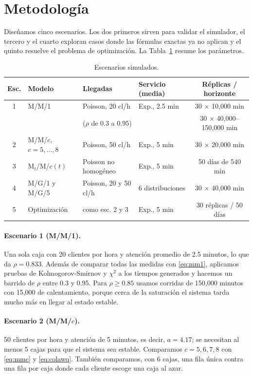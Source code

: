 \documentclass[11pt,letterpaper]{article}
\begin{document}
\section{Metodología}
Diseñamos cinco escenarios. Los dos primeros sirven para validar el simulador, el tercero
y el cuarto exploran casos donde las fórmulas exactas ya no aplican y el quinto resuelve
el problema de optimización. La Tabla~\ref{tab:escenarios} resume los parámetros.

\begin{table}[H]
\centering
\caption{Escenarios simulados.}
\label{tab:escenarios}
\small
\begin{tabular}{@{}clllc@{}}
\toprule
Esc. & Modelo & Llegadas & Servicio (media) & Réplicas / horizonte \\
\midrule
1 & M/M/1 & Poisson, 20 cl/h & Exp., 2.5 min & 30 $\times$ 10{,}000 min \\
  & & ($\rho$ de 0.3 a 0.95) & & 30 $\times$ 40{,}000--150{,}000 min \\
2 & M/M/$c$, $c=5,\dots,8$ & Poisson, 50 cl/h & Exp., 5 min & 30 $\times$ 20{,}000 min \\
3 & M$_t$/M/$c(t)$ & Poisson no homogéneo & Exp., 5 min & 50 días de 540 min \\
4 & M/G/1 y M/G/5 & Poisson, 20 y 50 cl/h & 6 distribuciones & 30 $\times$ 40{,}000 min \\
5 & Optimización & como esc. 2 y 3 & Exp., 5 min & 30 réplicas / 50 días \\
\bottomrule
\end{tabular}
\end{table}

\paragraph{Escenario 1 (M/M/1).} Una sola caja con 20 clientes por hora y atención promedio
de 2.5 minutos, lo que da $\rho = 0.833$. Además de comparar todas las medidas con
\eqref{eq:mm1}, aplicamos pruebas de Kolmogorov-Smirnov y $\chi^2$ a los tiempos generados
y hacemos un barrido de $\rho$ entre 0.3 y 0.95. Para $\rho \ge 0.85$ usamos corridas de
150{,}000 minutos con 15{,}000 de calentamiento, porque cerca de la saturación el sistema
tarda mucho más en llegar al estado estable.

\paragraph{Escenario 2 (M/M/$c$).} 50 clientes por hora y atención de 5 minutos, es decir,
$a = 4.17$; se necesitan al menos 5 cajas para que el sistema sea estable. Comparamos
$c = 5,6,7,8$ con \eqref{eq:mmc} y \eqref{eq:colawq}. También comparamos, con 6 cajas, una
fila única contra una fila por caja donde cada cliente escoge una caja al azar.
\end{document}
